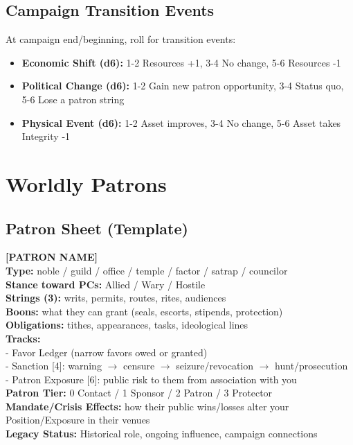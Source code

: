 \documentclass[11pt]{article}
\begin{document}
\subsection{Campaign Transition Events}
At campaign end/beginning, roll for transition events:
\begin{itemize}
  \item \textbf{Economic Shift (d6):} 1-2 Resources +1, 3-4 No change, 5-6 Resources -1
  \item \textbf{Political Change (d6):} 1-2 Gain new patron opportunity, 3-4 Status quo, 5-6 Lose a patron string
  \item \textbf{Physical Event (d6):} 1-2 Asset improves, 3-4 No change, 5-6 Asset takes Integrity -1
\end{itemize}

\section{Worldly Patrons}
\subsection{Patron Sheet (Template)}
\begin{framed}
\noindent\textbf{[PATRON NAME]}\\
\textbf{Type:} noble / guild / office / temple / factor / satrap / councilor\\
\textbf{Stance toward PCs:} Allied / Wary / Hostile\\
\textbf{Strings (3):} writs, permits, routes, rites, audiences\\
\textbf{Boons:} what they can grant (seals, escorts, stipends, protection)\\
\textbf{Obligations:} tithes, appearances, tasks, ideological lines\\
\textbf{Tracks:}\\
\hspace{10pt}- Favor Ledger (narrow favors owed or granted)\\
\hspace{10pt}- Sanction [4]: warning $\rightarrow$ censure $\rightarrow$ seizure/revocation $\rightarrow$ hunt/prosecution\\
\hspace{10pt}- Patron Exposure [6]: public risk to them from association with you\\
\textbf{Patron Tier:} 0 Contact / 1 Sponsor / 2 Patron / 3 Protector\\
\textbf{Mandate/Crisis Effects:} how their public wins/losses alter your Position/Exposure in their venues\\
\textbf{Legacy Status:} Historical role, ongoing influence, campaign connections
\end{framed}
\end{document}

